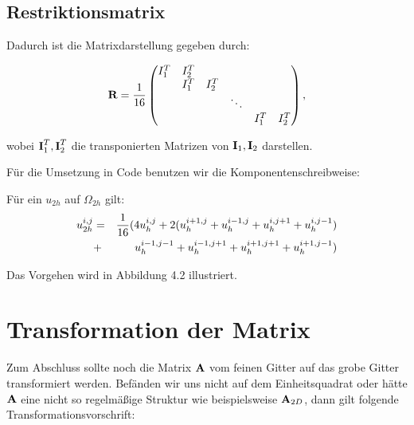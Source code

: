 \subsection{Restriktionsmatrix}

Dadurch ist die Matrixdarstellung gegeben durch:

\begin{equation}
{\textbf{R}} = \frac{1}{16}
\begin{pmatrix}
I_{1}^{T} & I_{2}^{T}\\
		  & I_{1}^{T} & I_{2}^{T}\\
		  &			  &			  & \ddots\\
		  &			  &			  &		   & I_{1}^{T} & I_{2}^{T}
\end{pmatrix},
\end{equation}

wobei ${\textbf{I}}_{1}^{T}, {\textbf{I}}_{2}^{T}$ die transponierten Matrizen von ${\textbf{I}}_{1}, {\textbf{I}}_{2}$ darstellen.

Für die Umsetzung in Code benutzen wir die Komponentenschreibweise:

Für ein $u_{2h}$ auf $\Omega_{2h}$ gilt:
\begin{eqnarray}
u_{2h}^{i,j} &=& \frac {1} {16} (4u_{h}^{i,j}+2(u_{h}^{i+1,j}+u_{h}^{i-1,j}+u_{h}^{i,j+1}+u_{h}^{i,j-1})\notag \\
&+& u_{h}^{i-1,j-1}+u_{h}^{i-1,j+1}+u_{h}^{i+1,j+1}+u_{h}^{i+1,j-1})
\end{eqnarray}

Das Vorgehen wird in Abbildung 4.2 illustriert.

 \label{img.restriction}

\section{Transformation der Matrix}

Zum Abschluss sollte noch die Matrix ${\textbf{A}}$ vom feinen Gitter auf das grobe Gitter transformiert werden. Befänden wir uns nicht auf dem Einheitsquadrat oder hätte ${\textbf{A}}$ eine nicht so regelmäßige Struktur wie beispielsweise ${\textbf{A}}_{2D}$, dann gilt folgende Transformationsvorschrift:


